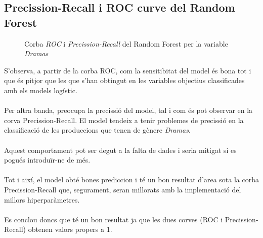 \documentclass[a4paper, 11pt]{article}
\begin{document}
\subsection{Precission-Recall i ROC curve del Random Forest}
\begin{figure}[h]
\centering
    \caption{Corba \textit{ROC} i \textit{Precission-Recall} del Random Forest per la variable \textit{Dramas}}
    \label{fig:my_label}
\end{figure}
\hspace{-1.5em}S'observa, a partir de la corba ROC, com la sensitibitat del model és bona tot i que és pitjor que les que s'han obtingut en les variables objectius classificades amb els models logístic.\\\\
Per altra banda, preocupa la precissió del model, tal i com és pot observar en la corva Precission-Recall. El model tendeix a tenir problemes de precissió en la classificació de les produccions que tenen de gènere \textit{Dramas}. \\\\
Aquest comportament pot ser degut a la falta de dades i seria mitigat si es pogués introduïr-ne de més.\\\\
Tot i així, el model obté bones prediccion i té un bon resultat d'area sota la corba Precission-Recall que, segurament, seran millorats amb la implementació del millors hiperparàmetres.\\\\
Es conclou doncs que té un bon resultat ja que les dues corves (ROC i Precission-Recall) obtenen valors propers a 1.
\newpage 
\end{document}
